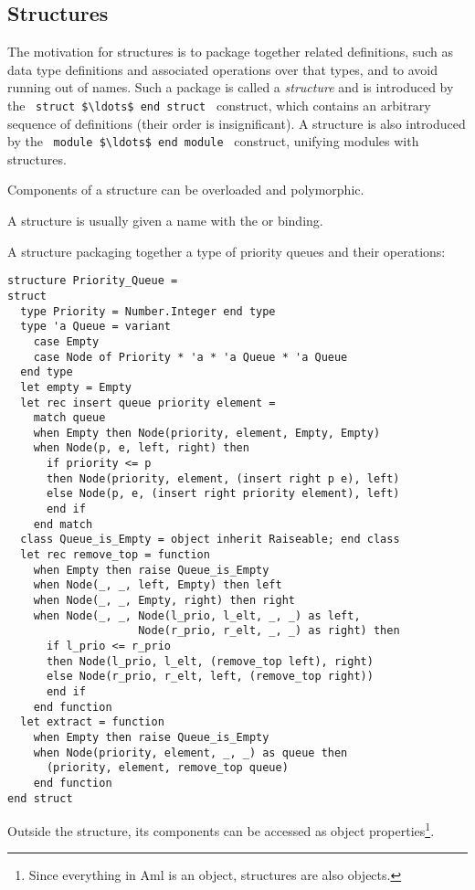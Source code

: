 \subsection{Structures}

The motivation for structures is to package together related definitions, such as data type definitions and associated operations over that types, and to avoid running out of names. Such a package is called a {\em structure} and is introduced by the ~\lstinline!struct $\ldots$ end struct!~ construct, which contains an arbitrary sequence of definitions (their order is insignificant). A structure is also introduced by the ~\lstinline!module $\ldots$ end module!~ construct, unifying modules with structures. 

Components of a structure can be overloaded and polymorphic. 

A structure is usually given a name with the  or  binding. 

\example A structure packaging together a type of priority queues and their operations:
\begin{lstlisting}
structure Priority_Queue =
struct
  type Priority = Number.Integer end type
  type 'a Queue = variant 
    case Empty
    case Node of Priority * 'a * 'a Queue * 'a Queue
  end type
  let empty = Empty
  let rec insert queue priority element =
    match queue
    when Empty then Node(priority, element, Empty, Empty)
    when Node(p, e, left, right) then
      if priority <= p
      then Node(priority, element, (insert right p e), left)
      else Node(p, e, (insert right priority element), left)
      end if
    end match
  class Queue_is_Empty = object inherit Raiseable; end class
  let rec remove_top = function
    when Empty then raise Queue_is_Empty
    when Node(_, _, left, Empty) then left
    when Node(_, _, Empty, right) then right
    when Node(_, _, Node(l_prio, l_elt, _, _) as left, 
                    Node(r_prio, r_elt, _, _) as right) then
      if l_prio <= r_prio
      then Node(l_prio, l_elt, (remove_top left), right)
      else Node(r_prio, r_elt, left, (remove_top right))
      end if
    end function
  let extract = function
    when Empty then raise Queue_is_Empty
    when Node(priority, element, _, _) as queue then
      (priority, element, remove_top queue)
    end function
end struct
\end{lstlisting}

Outside the structure, its components can be accessed as object properties\footnote{Since everything in Aml is an object, structures are also objects.}. 

